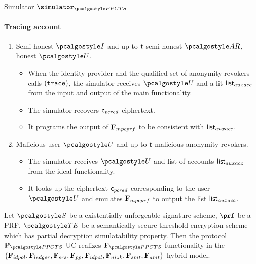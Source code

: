 \documentclass[runningheads,10pt]{llncs}
\numberwithin{equation}{section}
\begin{document}
\begin{simbox}{Simulator $\simulator_{\PPCTS}$}
  \paragraph{Tracing account}
  \begin{enumerate}
  \item Semi-honest $\idprov$ and up to $\mathsf{t}$ semi-honest $\ar$,
    honest $\user$.
    \begin{itemize}
    \item When the identity provider and the qualified set of anonymity
      revokers calls $(\mathtt{trace})$, the simulator receives $\user$ and a lit
      ${\mathsf{list}_{auxacc}}$ from the input and output of the main functionality.
    \item The simulator recovers $\mathsf{c}_{pcred}$ ciphertext.
    \item It programs the output of $\mathbf{F}_{{mpcprf}}$ to be consistent with
    ${\mathsf{list}_{auxacc}}$.
    \end{itemize}
  \item Malicious user $\user$ and up to $\mathsf{t}$ malicious anonymity
    revokers.
    \begin{itemize}
    \item The simulator receives $\user$ and list of accounts
      ${\mathsf{list}_{auxacc}}$ from the ideal functionality.
    \item It looks up the ciphertext $\mathsf{c}_{pcred}$ corresponding to the user $\user$
      and emulates $\mathbf{F}_{{mpcprf}}$ to output the list ${\mathsf{list}_{auxacc}}$.
    \end{itemize}
  \end{enumerate}
\end{simbox}

\begin{theorem}
  Let $\SIG$ be a existentially unforgeable signature scheme, $\prf$ be a PRF,
  $\TENC$ be a semantically secure threshold encryption scheme which has
  partial decryption simulatability property. Then the protocol $\prot{\PPCTS}$
  UC-realizes $\func{\PPCTS}$ functionality in the $\{\mathbf{F}_{{idpol}},
  \mathbf{F}_{{ledger}}, \mathbf{F}_{{srs}}, \mathbf{F}_{{pp}}, \mathbf{F}_{{idpol}}, \mathbf{F}_{{nizk}}, \mathbf{F}_{{smt}},
  \mathbf{F}_{{amt}}\}$-hybrid model.
\end{theorem}
\end{document}
